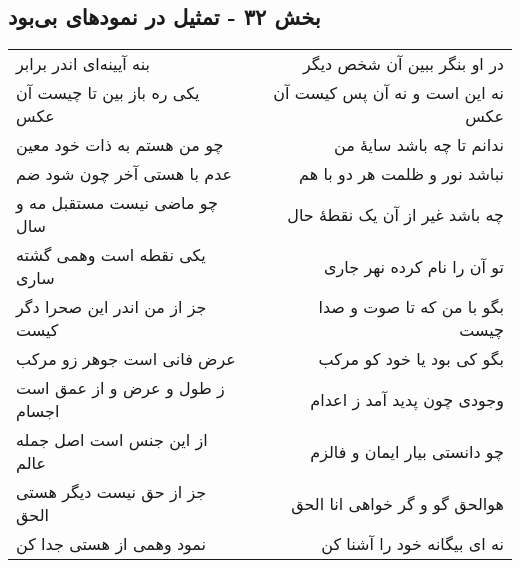 \begin{center}
\section*{بخش ۳۲ - تمثیل در نمودهای بی‌بود}
\label{sec:sh032}
\begin{longtable}{l p{0.5cm} r}
بنه آیینه‌ای اندر برابر
&&
در او بنگر ببین آن شخص دیگر
\\
یکی ره باز بین تا چیست آن عکس
&&
نه این است و نه آن پس کیست آن عکس
\\
چو من هستم به ذات خود معین
&&
ندانم تا چه باشد سایهٔ من
\\
عدم با هستی آخر چون شود ضم
&&
نباشد نور و ظلمت هر دو با هم
\\
چو ماضی نیست مستقبل مه و سال
&&
چه باشد غیر از آن یک نقطهٔ حال
\\
یکی نقطه است وهمی گشته ساری
&&
تو آن را نام کرده نهر جاری
\\
جز از من اندر این صحرا دگر کیست
&&
بگو با من که تا صوت و صدا چیست
\\
عرض فانی است جوهر زو مرکب
&&
بگو کی بود یا خود کو مرکب
\\
ز طول و عرض و از عمق است اجسام
&&
وجودی چون پدید آمد ز اعدام
\\
از این جنس است اصل جمله عالم
&&
چو دانستی بیار ایمان و فالزم
\\
جز از حق نیست دیگر هستی الحق
&&
هوالحق گو و گر خواهی انا الحق
\\
نمود وهمی از هستی جدا کن
&&
نه ای بیگانه خود را آشنا کن
\\
\end{longtable}
\end{center}
